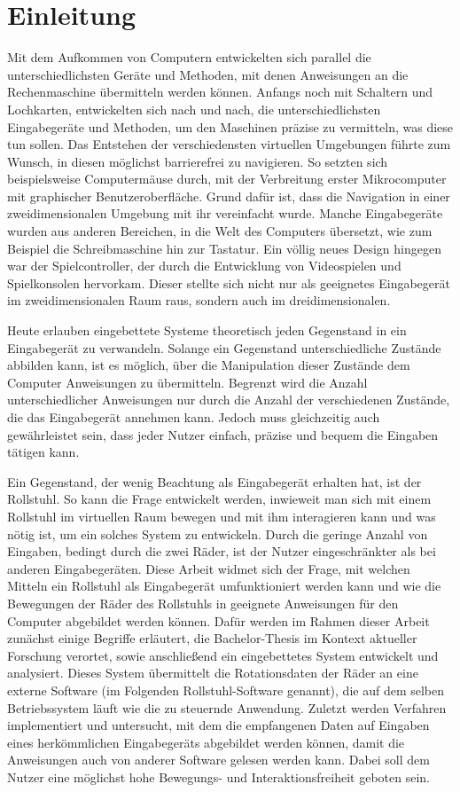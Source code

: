 \chapter{Einleitung}
Mit dem Aufkommen von Computern entwickelten sich parallel die unterschiedlichsten Geräte und Methoden, mit denen Anweisungen an die Rechenmaschine übermitteln werden können.
Anfangs noch mit Schaltern und Lochkarten, entwickelten sich nach und nach, die unterschiedlichsten Eingabegeräte und Methoden, um den Maschinen präzise zu vermitteln, was diese tun sollen.
Das Entstehen der verschiedensten virtuellen Umgebungen führte zum Wunsch, in diesen möglichst barrierefrei zu navigieren.
So setzten sich beispielsweise Computermäuse durch, mit der Verbreitung erster Mikrocomputer mit graphischer Benutzeroberfläche.
Grund dafür ist, dass die Navigation in einer zweidimensionalen Umgebung mit ihr vereinfacht wurde.
Manche Eingabegeräte wurden aus anderen Bereichen, in die Welt des Computers übersetzt, wie zum Beispiel die Schreibmaschine hin zur Tastatur.
Ein völlig neues Design hingegen war der Spielcontroller, der durch die Entwicklung von Videospielen und Spielkonsolen hervorkam.
Dieser stellte sich nicht nur als geeignetes Eingabegerät im zweidimensionalen Raum raus, sondern auch im dreidimensionalen.

Heute erlauben eingebettete Systeme theoretisch jeden Gegenstand in ein Eingabegerät zu verwandeln.
Solange ein Gegenstand unterschiedliche Zustände abbilden kann, ist es möglich, über die Manipulation dieser Zustände dem Computer Anweisungen zu übermitteln.
Begrenzt wird die Anzahl unterschiedlicher Anweisungen nur durch die Anzahl der verschiedenen Zustände, die das Eingabegerät annehmen kann.
Jedoch muss gleichzeitig auch gewährleistet sein, dass jeder Nutzer einfach, präzise und bequem die Eingaben tätigen kann.

Ein Gegenstand, der wenig Beachtung als Eingabegerät erhalten hat, ist der Rollstuhl.
So kann die Frage entwickelt werden, inwieweit man sich mit einem Rollstuhl im virtuellen Raum bewegen und mit ihm interagieren kann und was nötig ist, um ein solches System zu entwickeln.
Durch die geringe Anzahl von Eingaben, bedingt durch die zwei Räder, ist der Nutzer eingeschränkter als bei anderen Eingabegeräten.
Diese Arbeit widmet sich der Frage, mit welchen Mitteln ein Rollstuhl als Eingabegerät umfunktioniert werden kann und wie die Bewegungen der Räder des Rollstuhls in geeignete Anweisungen für den Computer abgebildet werden können.
Dafür werden im Rahmen dieser Arbeit zunächst einige Begriffe erläutert, die Bachelor-Thesis im Kontext aktueller Forschung verortet, sowie anschließend ein eingebettetes System entwickelt und analysiert.
Dieses System übermittelt die Rotationsdaten der Räder an eine externe Software (im Folgenden Rollstuhl-Software genannt), die auf dem selben Betriebssystem läuft wie die zu steuernde Anwendung.
Zuletzt werden Verfahren implementiert und untersucht, mit dem die empfangenen Daten auf Eingaben eines herkömmlichen Eingabegeräts abgebildet werden können, damit die Anweisungen auch von anderer Software gelesen werden kann.
Dabei soll dem Nutzer eine möglichst hohe Bewegungs- und Interaktionsfreiheit geboten sein.